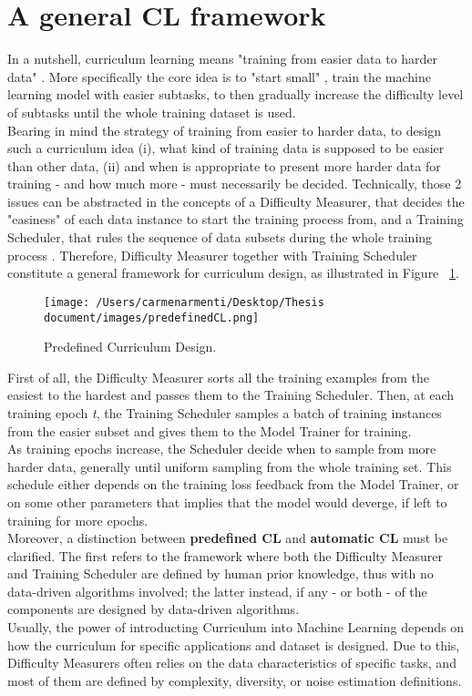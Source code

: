 \section{A general CL framework}
In a nutshell, curriculum learning means "training from easier data to harder data" \cite{Wang2020}. More specifically the
core idea is to "start small" \cite{ELMAN199371}, train the machine learning model with easier subtasks, to then gradually increase
the difficulty level of subtasks until the whole training dataset is used.\\
Bearing in mind the strategy of training from easier to harder data, to design such a curriculum idea 
(i), what kind of training data is supposed to be easier than other data, (ii) and when is appropriate to present more harder
data for training - and how much more - must necessarily be decided.
Technically, those 2 issues can be abstracted in the concepts of a Difficulty Measurer, that decides the "easiness"
of each data instance to start the training process from, and a Training Scheduler, that rules the sequence of data subsets during 
the whole training process \cite{Wang2020}.
Therefore, Difficulty Measurer together with Training Scheduler constitute a general framework for curriculum design,
as illustrated in Figure ~\ref{fig:CLdesign}.
\begin{figure}[h]
    \begin{center}
        \texttt{[image: /Users/carmenarmenti/Desktop/Thesis document/images/predefinedCL.png]}
        \caption{\label{fig:CLdesign}Predefined Curriculum Design.}
    \end{center}
\end{figure}
First of all, the Difficulty Measurer sorts all the training examples from the easiest 
to the hardest and passes them to the Training Scheduler. Then, at each training epoch \textit{t}, the Training Scheduler
samples a batch of training instances from the easier subset and gives them to the Model Trainer for training.\\
As training epochs increase, the Scheduler decide when to sample from more harder data, generally until uniform sampling
from the whole training set. This schedule either depends on the training loss feedback from the Model Trainer, or on some other
parameters that implies that the model would deverge, if left to training for more epochs.\\
Moreover, a distinction between \textbf{predefined CL} and \textbf{automatic CL} must be clarified. The first refers to the framework
where both the Difficulty Measurer and Training Scheduler are defined by human prior knowledge, thus with no data-driven
algorithms involved; the latter instead, if any - or both - of the components are designed by data-driven algorithms.\\
Usually, the power of introducting Curriculum into Machine Learning depends on how the curriculum for specific
applications and dataset is designed. Due to this, Difficulty Measurers often relies on the data
characteristics of specific tasks, and most of them are defined by complexity, diversity, or noise estimation
definitions.\\


